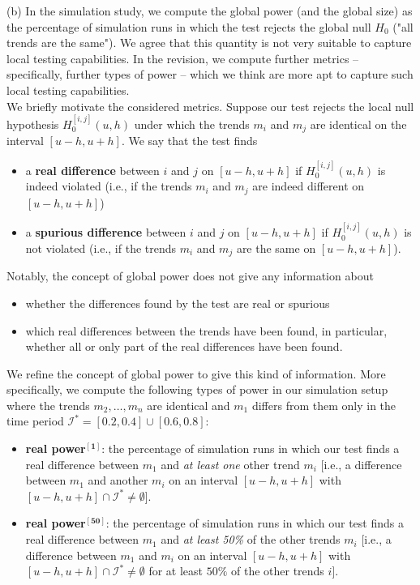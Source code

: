 \documentclass[a4paper,12pt]{article}
\begin{document}
\begin{enumerate}[label=\arabic*.,leftmargin=0.6cm]
(b) In the simulation study, we compute the global power (and the global size) as the percentage of simulation runs in which the test rejects the global null $H_0$ ("all trends are the same"). 
We agree that this quantity is not very suitable to capture local testing capabilities. In the revision, we compute further metrics -- specifically, further types of power -- which we think are more apt to capture such local testing capabilities. \\
We briefly motivate the considered metrics. 
Suppose our test rejects the local null hypothesis $H_0^{[i,j]}(u,h)$ under which the trends $m_i$ and $m_j$ are identical on the interval $[u-h,u+h]$. We say that the test finds
\begin{itemize}
\item a \textbf{real difference} between $i$ and $j$ on $[u-h,u+h]$ if $H_0^{[i,j]}(u,h)$ is indeed violated (i.e., if the trends $m_i$ and $m_j$ are indeed different on $[u-h,u+h]$) 
\item a \textbf{spurious difference} between $i$ and $j$ on $[u-h,u+h]$ if $H_0^{[i,j]}(u,h)$ is not violated (i.e., if the trends $m_i$ and $m_j$ are the same on $[u-h,u+h]$). 
\end{itemize}
Notably, the concept of global power does not give any information about
\begin{itemize}
\item whether the differences found by the test are real or spurious
\item which real differences between the trends have been found, in particular, whether all or only part of the real differences have been found.
\end{itemize}
We refine the concept of global power to give this kind of information. More specifically, we compute the following types of power in our simulation setup where the trends $m_2,\ldots,m_n$ are identical and $m_1$ differs from them only in the time period $\mathcal{I}^* = [0.2, 0.4] \cup [0.6, 0.8]$:
\begin{itemize}
\item \textbf{real power$^{\boldsymbol{[1]}}$}: the percentage of simulation runs in which our test finds a real difference between $m_1$ and \textit{at least one} other trend $m_i$ [i.e., a difference between $m_1$ and another $m_i$ on an interval $[u-h, u+h]$ with $[u-h, u+h] \cap \mathcal{I}^* \neq \emptyset$]. 
\item \textbf{real power$^{\boldsymbol{[50]}}$}: the percentage of simulation runs in which our test finds a real difference between $m_1$ and \textit{at least 50\%} of the other trends $m_i$ [i.e., a difference between $m_1$ and $m_i$ on an interval $[u-h, u+h]$ with $[u-h, u+h] \cap \mathcal{I}^* \neq \emptyset$ for at least $50\%$ of the other trends $i$]. 

\end{itemize}
\end{enumerate}
\end{document}
